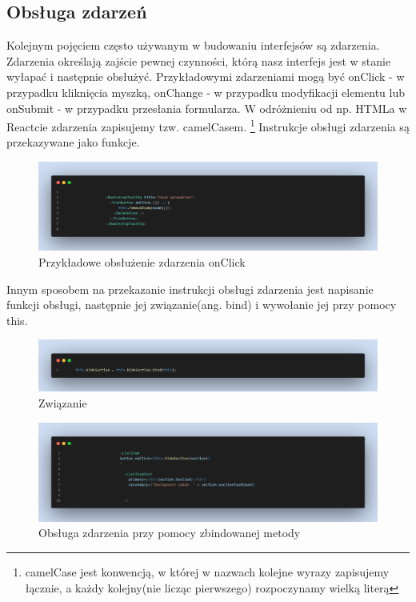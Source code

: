 \documentclass[oneside,polski,logo,indent]{amuthesis}
\begin{document}
\begin{enumerate}
\begin{enumerate}
\begin{figure}[H]
\end{figure}	

\subsection{Obsługa zdarzeń}
{
Kolejnym pojęciem często używanym w budowaniu interfejsów są zdarzenia. Zdarzenia określają zajście pewnej czynności, którą nasz interfejs jest w stanie wyłapać i następnie obsłużyć.
Przykładowymi zdarzeniami mogą być onClick - w przypadku kliknięcia myszką, onChange - w przypadku modyfikacji elementu lub onSubmit - w przypadku przesłania formularza.
W odróżnieniu od np. HTMLa w Reactcie zdarzenia zapisujemy tzw. camelCasem. \footnote{camelCase jest konwencją, w której w nazwach kolejne wyrazy zapisujemy łącznie, a każdy kolejny(nie licząc pierwszego) rozpoczynamy wielką literą}
Instrukcje obsługi zdarzenia są przekazywane jako funkcje.

\begin{figure}[H]
\centering
\includegraphics[width=13cm]{onclick remove exam.png}
\caption{Przykładowe obsłużenie zdarzenia onClick
}

\end{figure}	

}

Innym sposobem na przekazanie instrukcji obsługi zdarzenia jest napisanie funkcji obsługi, następnie jej związanie(ang. bind) i wywołanie jej przy pomocy this.

\begin{figure}[H]
\centering
\includegraphics[width=13cm]{zbindowanie.png}
\caption{Związanie
}

\end{figure}	

\begin{figure}[H]
\centering
\includegraphics[width=13cm]{hidesection wywo.png}
\caption{Obsługa zdarzenia przy pomocy zbindowanej metody
}


\end{figure}
\end{enumerate}
\end{enumerate}
\end{document}
